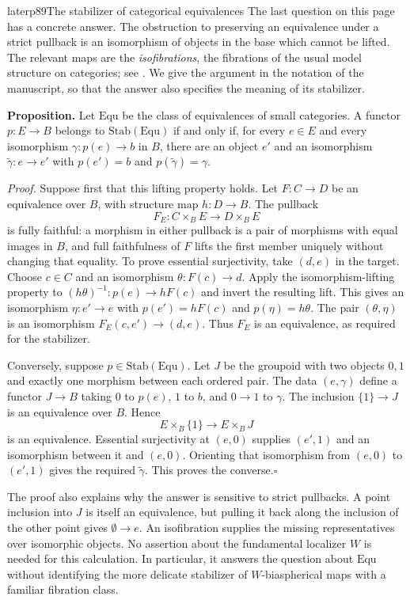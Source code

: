 \begin{dcomment}{later}{p89}{The stabilizer of categorical equivalences}
The last question on this page has a concrete answer. The obstruction to preserving an equivalence under a strict pullback is an isomorphism of objects in the base which cannot be lifted. The relevant maps are the \emph{isofibrations}, the fibrations of the usual model structure on categories; see \citet[\S2 and Theorem~3.1]{Rezk1996Categories}. We give the argument in the notation of the manuscript, so that the answer also specifies the meaning of its stabilizer.

\textbf{Proposition.} Let $\mathrm{Equ}$ be the class of equivalences of small categories. A functor $p:E\to B$ belongs to $\mathrm{Stab}(\mathrm{Equ})$ if and only if, for every $e\in E$ and every isomorphism $\gamma:p(e)\to b$ in $B$, there are an object $e'$ and an isomorphism $\widetilde\gamma:e\to e'$ with $p(e')=b$ and $p(\widetilde\gamma)=\gamma$.

\emph{Proof.} Suppose first that this lifting property holds. Let $F:C\to D$ be an equivalence over $B$, with structure map $h:D\to B$. The pullback
\[
 F_E:C\times_B E\longrightarrow D\times_B E
\]
is fully faithful: a morphism in either pullback is a pair of morphisms with equal images in $B$, and full faithfulness of $F$ lifts the first member uniquely without changing that equality. To prove essential surjectivity, take $(d,e)$ in the target. Choose $c\in C$ and an isomorphism $\theta:F(c)\to d$. Apply the isomorphism-lifting property to $(h\theta)^{-1}:p(e)\to hF(c)$ and invert the resulting lift. This gives an isomorphism $\eta:e'\to e$ with $p(e')=hF(c)$ and $p(\eta)=h\theta$. The pair $(\theta,\eta)$ is an isomorphism $F_E(c,e')\to(d,e)$. Thus $F_E$ is an equivalence, as required for the stabilizer.

Conversely, suppose $p\in\mathrm{Stab}(\mathrm{Equ})$. Let $J$ be the groupoid with two objects $0,1$ and exactly one morphism between each ordered pair. The data $(e,\gamma)$ define a functor $J\to B$ taking $0$ to $p(e)$, $1$ to $b$, and $0\to1$ to $\gamma$. The inclusion $\{1\}\to J$ is an equivalence over $B$. Hence
\[
 E\times_B\{1\}\longrightarrow E\times_BJ
\]
is an equivalence. Essential surjectivity at $(e,0)$ supplies $(e',1)$ and an isomorphism between it and $(e,0)$. Orienting that isomorphism from $(e,0)$ to $(e',1)$ gives the required $\widetilde\gamma$. This proves the converse.\hfill$\square$

The proof also explains why the answer is sensitive to strict pullbacks. A point inclusion into $J$ is itself an equivalence, but pulling it back along the inclusion of the other point gives $\emptyset\to e$. An isofibration supplies the missing representatives over isomorphic objects. No assertion about the fundamental localizer $W$ is needed for this calculation. In particular, it answers the question about $\mathrm{Equ}$ without identifying the more delicate stabilizer of $W$-biaspherical maps with a familiar fibration class.
\end{dcomment}


